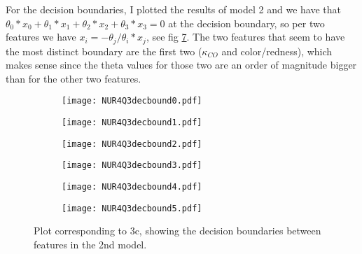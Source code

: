 For the decision boundaries, I plotted the results of model 2 and we have that $\theta_0 * x_0 + \theta_1 * x_1 + \theta_2 * x_2 + \theta_3 * x_3 = 0$ at the decision boundary, so per two features we have $x_i = -\theta_j/\theta_i * x_j$, see fig \ref{fig:fig6}. The two features that seem to have the most distinct boundary are the first two ($\kappa_{CO}$ and color/redness), which makes sense since the theta values for those two are an order of magnitude bigger than for the other two features.

\begin{figure}[ht]
     \begin{subfigure}{.49\textwidth}
       \centering
    \texttt{[image: NUR4Q3decbound0.pdf]}
    \centering
    \label{}
    \end{subfigure}
    \begin{subfigure}{.49\textwidth}
       \centering
    \texttt{[image: NUR4Q3decbound1.pdf]}
    \centering
    \label{}
    \end{subfigure}
    \hfill
    \begin{subfigure}{.49\textwidth}
       \centering
    \texttt{[image: NUR4Q3decbound2.pdf]}
    \centering
    \label{}
    \end{subfigure}
     \begin{subfigure}{.49\textwidth}
       \centering
    \texttt{[image: NUR4Q3decbound3.pdf]}
    \centering
    \label{}
    \end{subfigure}
     \begin{subfigure}{.49\textwidth}
       \centering
    \texttt{[image: NUR4Q3decbound4.pdf]}
    \centering
    \label{}
    \end{subfigure}
         \begin{subfigure}{.49\textwidth}
       \centering
    \texttt{[image: NUR4Q3decbound5.pdf]}
    \centering
    \label{}
    \end{subfigure}
    \caption{Plot corresponding to 3c, showing the decision boundaries between features in the 2nd model.}
    \label{fig:fig6}
\end{figure}

